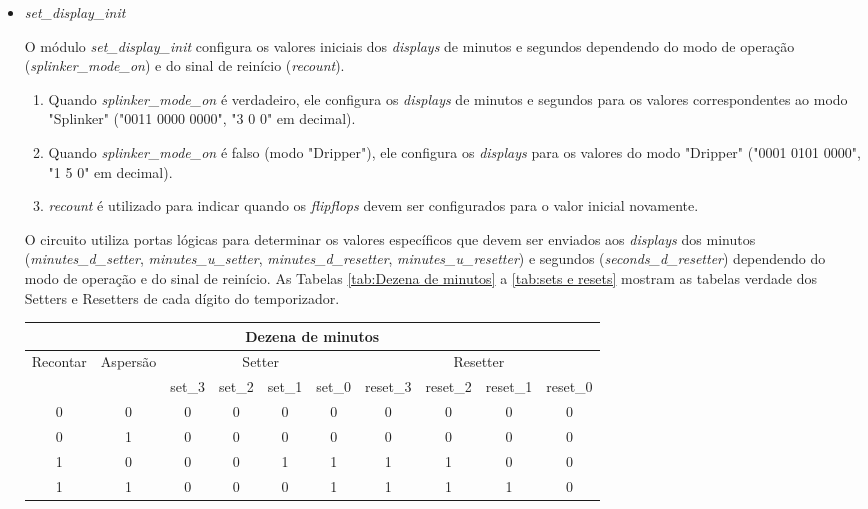 \documentclass[
	article,			%
	11pt,				%
	oneside,			%
	a4paper,			%
	english,			%
	brazil,				%
	sumario=tradicional
	]{abntex2}
\begin{document}
\begin{itemize}
    \item \textit{set\_display\_init}

    O módulo \textit{set\_display\_init} configura os valores iniciais dos \textit{displays} de minutos e segundos dependendo do modo de operação (\textit{splinker\_mode\_on}) e do sinal de reinício (\textit{recount}).

    \begin{enumerate}
        \item Quando \textit{splinker\_mode\_on} é verdadeiro, ele configura os \textit{displays} de minutos e segundos para os valores correspondentes ao modo "Splinker" ("0011 0000 0000", "3 0 0" em decimal).
        \item Quando \textit{splinker\_mode\_on} é falso (modo "Dripper"), ele configura os \textit{displays} para os valores do modo "Dripper" ("0001 0101 0000", "1 5 0" em decimal).
        \item \textit{recount} é utilizado para indicar quando os \textit{flipflops} devem ser configurados para o valor inicial novamente.
    \end{enumerate}

    O circuito utiliza portas lógicas para determinar os valores específicos que devem ser enviados aos \textit{displays} dos minutos (\textit{minutes\_d\_setter}, \textit{minutes\_u\_setter}, \textit{minutes\_d\_resetter}, \textit{minutes\_u\_resetter}) e segundos (\textit{seconds\_d\_resetter}) dependendo do modo de operação e do sinal de reinício. As Tabelas \ref{tab:Dezena de minutos} a \ref{tab:sets e resets} mostram as tabelas verdade dos Setters e Resetters de cada dígito do temporizador.


\begin{table}[H]
\centering
\begin{tabular}{| c  |c  |c  |c |c |c  |c  |c |c |c |}
\hline
\multicolumn{10}{|c|}{Dezena de minutos} \\
\hline
Recontar& Aspersão& \multicolumn{4}{|c|}{Setter} & \multicolumn{4}{|c|}{Resetter} \\
\hline
 &  & set_3& set_2& set_1& set_0& reset_3& reset_2& reset_1& reset_0\\ \hline 
0 & 0 & 0 & 0 & 0 & 0 & 0 & 0 & 0 & 0 \\ \hline 
0 & 1 & 0 & 0 & 0 & 0 & 0 & 0 & 0 & 0 \\ \hline 
1 & 0 & 0 & 0 & 1 & 1 & 1 & 1 & 0 & 0 \\ \hline
1 & 1 & 0 & 0 & 0 & 1 & 1 & 1 & 1 & 0 \\ \hline


\end{tabular}
\end{table}
\end{itemize}
\end{document}
